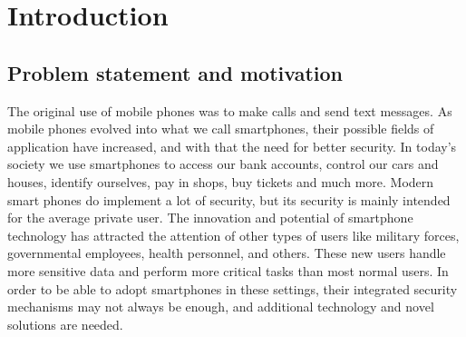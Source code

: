 \chapter{Introduction}
\section{Problem statement and motivation}
The original use of mobile phones was to make calls and send text messages. As mobile phones evolved into what we call smartphones, their possible fields of application have increased, and with that the need for better security. In today's society we use smartphones to access our bank accounts, control our cars and houses, identify ourselves, pay in shops, buy tickets and much more. Modern smart phones do implement a lot of security, but its security is mainly intended for the average private user. The innovation and potential of smartphone technology has attracted the attention of other types of users like military forces, governmental employees, health personnel, and others. These new users handle more sensitive data and perform more critical tasks than most normal users. In order to be able to adopt smartphones in these settings, their integrated security mechanisms may not always be enough, and additional technology and novel solutions are needed.



